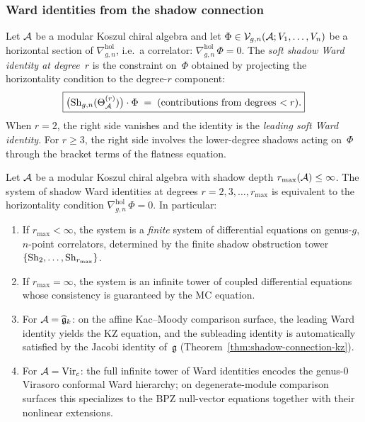 \subsubsection{Ward identities from the shadow connection}

\begin{definition}
\label{def:thqg-VI-soft-ward-identity}
Let $\mathcal{A}$ be a modular Koszul chiral algebra and let
$\Phi \in \mathcal{V}_{g,n}(\mathcal{A}; V_1, \dotsc, V_n)$ be a horizontal
section of $\nabla^{\mathrm{hol}}_{g,n}$, i.e.\ a correlator:
$\nabla^{\mathrm{hol}}_{g,n}\,\Phi = 0$.
The \emph{soft shadow Ward identity at degree~$r$} is the
constraint on~$\Phi$ obtained by projecting the horizontality
condition to the degree-$r$ component:
\begin{equation}\label{eq:thqg-VI-ward-degree-r}
\boxed{%
\bigl(\Sh_{g,n}(\Theta^{(r)}_\cA)\bigr) \cdot \Phi
\;=\;
\text{(contributions from degrees $< r$)}.}
\end{equation}
When $r = 2$, the right side vanishes and the identity is the
\emph{leading soft Ward identity}. For $r \geq 3$, the right side
involves the lower-degree shadows acting on~$\Phi$ through the
bracket terms of the flatness equation.
\end{definition}

\begin{theorem}
\label{thm:thqg-VI-ward-determines-correlators}
Let $\mathcal{A}$ be a modular Koszul chiral algebra with shadow depth
$r_{\max}(\mathcal{A}) \leq \infty$. The system of shadow Ward identities
at degrees $r = 2, 3, \dotsc, r_{\max}$ is equivalent to the
horizontality condition $\nabla^{\mathrm{hol}}_{g,n}\,\Phi = 0$.
In particular:
\begin{enumerate}[label=\textup{(\roman*)}]
\item If $r_{\max} < \infty$, the system is a \emph{finite}
 system of differential equations on genus-$g$, $n$-point
 correlators, determined by the finite shadow obstruction tower
 $\{\operatorname{Sh}_2, \dotsc, \operatorname{Sh}_{r_{\max}}\}$.
\item If $r_{\max} = \infty$, the system is an infinite tower
 of coupled differential equations whose consistency is
 guaranteed by the MC equation.
\item For $\mathcal{A} = \widehat{\mathfrak{g}}_k$:
 on the affine Kac--Moody comparison surface, the leading Ward
 identity yields the KZ equation, and the
 subleading identity is automatically satisfied by the Jacobi
 identity of~$\mathfrak{g}$
 (Theorem~\ref{thm:shadow-connection-kz}).
\item For $\mathcal{A} = \mathrm{Vir}_c$: the full infinite tower of
 Ward identities encodes the genus-$0$ Virasoro conformal Ward
 hierarchy; on degenerate-module comparison surfaces this
 specializes to the BPZ null-vector equations together with
 their nonlinear extensions.
\end{enumerate}
\end{theorem}

